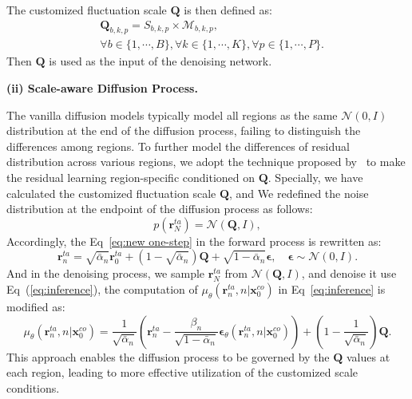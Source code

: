 The customized fluctuation scale \(\mathbf{Q}\) is then defined as:
\begin{equation}
\begin{aligned}
&\mathbf{Q}_{b,k,p}=S_{b,k,p}\times\mathcal{M}_{b,k,p},\\
&\forall b\in\{1,\cdots,B\}, \forall k\in\{1,\cdots,K\}, \forall p\in\{1,\cdots,P\}.
\end{aligned}
\end{equation}
Then \(\mathbf{Q}\) is used as the input of the denoising network. 





\noindent\textbf{(ii) Scale-aware Diffusion Process.}

The vanilla diffusion models typically model all regions as the same \(\mathcal{N}(0, I)\) distribution at the end of the diffusion process, failing to distinguish the differences among regions. To further model the differences of residual distribution across various regions, we adopt the technique proposed by~\cite{han2022card} to make the residual learning region-specific conditioned on \({\mathbf{Q}}\). Specially, we have calculated the customized fluctuation scale \({\mathbf{Q}}\), and We redefined the noise distribution at the endpoint of the diffusion process as follows:
\begin{equation}
    p(\mathbf{r}^{ta}_N)=\mathcal{N}({\mathbf{Q}},I),
\end{equation}
Accordingly, the Eq~\ref{eq:new one-step} in the forward process is rewritten as:
\begin{equation}
\label{eq:new one-step}
    \mathbf{r}_n^{ta} = \sqrt{\bar{\alpha}_n} \mathbf{r}_0^{ta}+(1-\sqrt{\bar{\alpha}_n})\mathbf{Q} + \sqrt{1 - \bar{\alpha}_n} \mathbf{\epsilon}, \quad \mathbf{\epsilon} \sim \mathcal{N}(0, I).
\end{equation}
And in the denoising process, we sample \(\mathbf{r}_N^{ta}\) from $\mathcal{N}({\mathbf{Q}},I)$, and denoise it use Eq~(\ref{eq:inference}), the computation of \(\mu_{\theta}(\mathbf{r}_n^{ta}, n| \mathbf{x}_0^{co})\) in Eq~\ref{eq:inference} is modified as:
\begin{equation}
\label{eq: mu}
    \mu_{\theta}(\mathbf{r}_n^{ta}, n| \mathbf{x}_0^{co})=\frac{1}{\sqrt{\bar{\alpha}_n}} \left( \mathbf{r}_n^{ta} - \frac{\beta_n}{\sqrt{1 - \bar{\alpha}_n}} \mathbf{\epsilon}_{\theta}(\mathbf{r}_n^{ta}, n| \mathbf{x}_0^{co}) \right)+(1-\frac{1}{\sqrt{\bar{\alpha}_n}})\mathbf{Q}.
\end{equation}
This approach enables the diffusion process to be governed by the \(\mathbf{Q}\) values at each region, leading to more effective utilization of the customized scale conditions.



